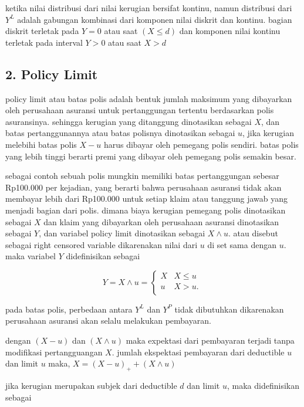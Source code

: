 \documentclass[
]{book}
\begin{document}
ketika nilai distribusi dari nilai kerugian bersifat kontinu, namun distribusi dari \(Y^L\) adalah gabungan kombinasi dari komponen nilai diskrit dan kontinu. bagian diskrit terletak pada \(Y=0\) atau saat \((X \leq d)\) dan komponen nilai kontinu terletak pada interval \(Y>0\) atau saat \(X>d\)

\hypertarget{policy-limit}{%
\subsection{2. Policy Limit}\label{policy-limit}}

policy limit atau batas polis adalah bentuk jumlah maksimum yang dibayarkan oleh perusahaan asuransi untuk pertanggungan tertentu berdasarkan polis asuransinya. sehingga kerugian yang ditanggung dinotasikan sebagai \(X\), dan batas pertanggunannya atau batas polisnya dinotasikan sebagai \(u\), jika kerugian melebihi batas polis \(X-u\) harus dibayar oleh pemegang polis sendiri. batas polis yang lebih tinggi berarti premi yang dibayar oleh pemegang polis semakin besar.

sebagai contoh sebuah polis mungkin memiliki batas pertanggungan sebesar Rp100.000 per kejadian, yang berarti bahwa perusahaan asuransi tidak akan membayar lebih dari Rp100.000 untuk setiap klaim atau tanggung jawab yang menjadi bagian dari polis.
dimana biaya kerugian pemegang polis dinotasikan sebagai \(X\) dan klaim yang dibayarkan oleh perusahaan asuransi dinotasikan sebagai \(Y\), dan variabel policy limit dinotasikan sebagai \(X \land u\). atau disebut sebagai right censored variable dikarenakan nilai dari \(u\) di set sama dengan \(u\). maka variabel \(Y\) didefinisikan sebagai

\[
Y = X \land u = \left\{ \begin{matrix}
X & X \leq u \\
u & X > u. \\
\end{matrix} \right.\
\]

pada batas polis, perbedaan antara \(Y^L\) dan \(Y^P\) tidak dibutuhkan dikarenakan perusahaan asuransi akan selalu melakukan pembayaran.

dengan \((X-u)\) dan \((X \land u)\) maka expektasi dari pembayaran terjadi tanpa modifikasi pertangguangan \(X\). jumlah ekspektasi pembayaran dari deductible \(u\) dan limit \(u\) maka, \(X=(X-u)_++(X\land u)\)

jika kerugian merupakan subjek dari deductible \(d\) dan limit \(u\), maka didefinisikan sebagai
\end{document}
